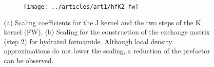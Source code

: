 \begin{figure}[htp]

\begin{subtable}{\textwidth}
\caption{}
\label{tab:GS_DFJKSCALE_FW}
\end{subtable}

\vspace{1.5\baselineskip}

\begin{subfigure}{\textwidth}
\centering
\texttt{[image: ../articles/art1/hfK2\_fw]}
\caption{}
\label{fig:GS_DFK2SCALE_FW}
\end{subfigure}

\caption[Scaling behavior of the J and K kernels for FW]{(a) Scaling coefficients for the J kernel and the two steps of the K kernel (FW). (b) Scaling for the construction of the exchange matrix (step 2) for hydrated formamide. Although local density approximations do not lower the scaling, a reduction of the prefactor can be observed.}

\end{figure}


